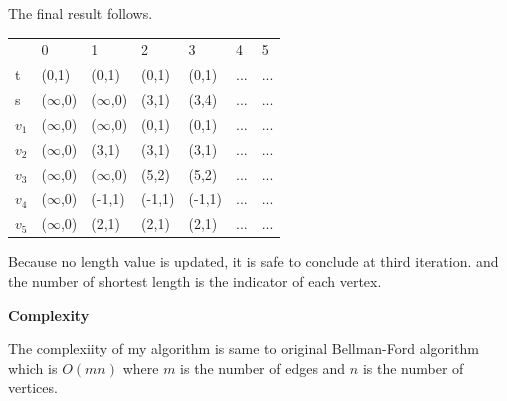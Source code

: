 \documentclass[a4paper,11pt]{article}
\begin{document}
\begin{enumerate}
The final result follows.
\begin{center}
\begin{tabular}{lllllll}
                       & 0                         & 1                     & 2                     & 3                     & 4                     & 5                     \\ \cline{2-7} 
\multicolumn{1}{l|}{t} & \multicolumn{1}{l|}{(0,1)} & \multicolumn{1}{l|}{(0,1)} & \multicolumn{1}{l|}{(0,1)} & \multicolumn{1}{l|}{(0,1)} & \multicolumn{1}{l|}{...} & \multicolumn{1}{l|}{...} \\ \cline{2-7} 
\multicolumn{1}{l|}{s} & \multicolumn{1}{l|}{($\infty$,0)} & \multicolumn{1}{l|}{($\infty$,0)} & \multicolumn{1}{l|}{(3,1)} & \multicolumn{1}{l|}{(3,4)} & \multicolumn{1}{l|}{...} & \multicolumn{1}{l|}{...} \\ \cline{2-7} 
\multicolumn{1}{l|}{$v_1$} & \multicolumn{1}{l|}{($\infty$,0)} & \multicolumn{1}{l|}{($\infty$,0)} & \multicolumn{1}{l|}{(0,1)} & \multicolumn{1}{l|}{(0,1)} & \multicolumn{1}{l|}{...} & \multicolumn{1}{l|}{...} \\ \cline{2-7} 
\multicolumn{1}{l|}{$v_2$} & \multicolumn{1}{l|}{($\infty$,0)} & \multicolumn{1}{l|}{(3,1)} & \multicolumn{1}{l|}{(3,1)} & \multicolumn{1}{l|}{(3,1)} & \multicolumn{1}{l|}{...} & \multicolumn{1}{l|}{...} \\ \cline{2-7} 
\multicolumn{1}{l|}{$v_3$} & \multicolumn{1}{l|}{($\infty$,0)} & \multicolumn{1}{l|}{($\infty$,0)} & \multicolumn{1}{l|}{(5,2)} & \multicolumn{1}{l|}{(5,2)} & \multicolumn{1}{l|}{...} & \multicolumn{1}{l|}{...} \\ \cline{2-7} 
\multicolumn{1}{l|}{$v_4$} & \multicolumn{1}{l|}{($\infty$,0)} & \multicolumn{1}{l|}{(-1,1)} & \multicolumn{1}{l|}{(-1,1)} & \multicolumn{1}{l|}{(-1,1)} & \multicolumn{1}{l|}{...} & \multicolumn{1}{l|}{...} \\ \cline{2-7}  
\multicolumn{1}{l|}{$v_5$} & \multicolumn{1}{l|}{($\infty$,0)} & \multicolumn{1}{l|}{(2,1)} & \multicolumn{1}{l|}{(2,1)} & \multicolumn{1}{l|}{(2,1)} & \multicolumn{1}{l|}{...} & \multicolumn{1}{l|}{...} \\ \cline{2-7} 
\end{tabular}
\end{center}

Because no length value is updated, it is safe to conclude at third iteration. and the number of shortest length is the indicator of each vertex.

{\bf Complexity}

The complexiity of my algorithm is same to original Bellman-Ford algorithm which is $O(mn)$ where $m$ is the number of edges and $n$ is the number of vertices.




\end{enumerate}
\end{document}
